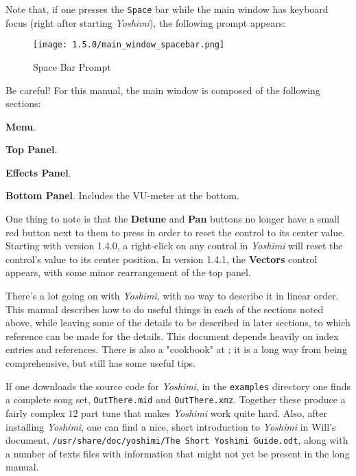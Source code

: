 \documentclass[
 11pt,
 twoside,
 a4paper,
 final                                 %
]{article}
\begin{document}
   Note that, if one presses the \texttt{Space} bar while the main window has
   keyboard focus (right after starting \textsl{Yoshimi}), the following prompt
   appears:

\begin{figure}[H]
   \centering 
   \texttt{[image: 1.5.0/main\_window\_spacebar.png]}
   \caption{Space Bar Prompt}
   \label{fig:yoshimi_main_spacebar_prompt}
\end{figure}

   Be careful!
   For this manual, the main window is composed of the following sections:

\begin{enumber}
   \item \textbf{Menu}.
   \item \textbf{Top Panel}.
   \item \textbf{Effects Panel}.
   \item \textbf{Bottom Panel}.  Includes the VU-meter at the bottom.
\end{enumber}

   One thing to note is that the \textbf{Detune} and \textbf{Pan} buttons no
   longer have a small red button next to them to press in order to reset the
   control to its center value.  Starting with version 1.4.0, a right-click on
   any control in \textsl{Yoshimi} will reset the control's value to its center
   position.  In version 1.4.1, the \textbf{Vectors} control appears, with some
   minor rearrangement of the top panel.

   There's a lot going on with \textsl{Yoshimi}, with no way to describe
   it in linear order.  This manual describes how to do useful things in
   each of the sections noted above, while leaving some of the details to be
   described in later sections, to which reference can be made for the details.
   This document depends heavily on index entries and references.
   There is also a "cookbook" at \cite{book}; it is a long way from being
   comprehensive, but still has some useful tips.

   If one downloads the source code for \textsl{Yoshimi}, in the
   \texttt{examples} directory one finds a complete song set,
   \texttt{OutThere.mid} and \texttt{OutThere.xmz}. Together these produce a
   fairly complex 12 part tune that makes \textsl{Yoshimi} work quite hard.
   Also, after installing \textsl{Yoshimi}, one can find a nice, short
   introduction to \textsl{Yoshimi} in Will's document,
   \texttt{/usr/share/doc/yoshimi/The Short Yoshimi Guide.odt},
   along with a number of texts files with information that might not yet be
   present in the long manual.
\end{document}
